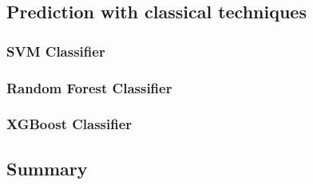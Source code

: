 \documentclass[12pt, a4paper]{article}
\begin{document}
\subsection{Prediction with classical techniques}

\subsubsection{SVM Classifier}

\subsubsection{Random Forest Classifier}

\subsubsection{XGBoost Classifier}

\subsection{Summary}



\end{document}
